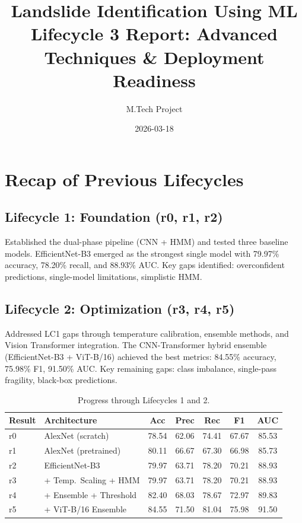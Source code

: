 \documentclass[11pt]{article}
\title{Landslide Identification Using ML \\ \large Lifecycle 3 Report: Advanced Techniques \& Deployment Readiness}
\author{M.Tech Project}
\date{2026-03-18}
\begin{document}
\maketitle

\section{Recap of Previous Lifecycles}

\subsection{Lifecycle 1: Foundation (r0, r1, r2)}

Established the dual-phase pipeline (CNN + HMM) and tested three baseline models. EfficientNet-B3 emerged as the strongest single model with 79.97\% accuracy, 78.20\% recall, and 88.93\% AUC. Key gaps identified: overconfident predictions, single-model limitations, simplistic HMM.

\subsection{Lifecycle 2: Optimization (r3, r4, r5)}

Addressed LC1 gaps through temperature calibration, ensemble methods, and Vision Transformer integration. The CNN-Transformer hybrid ensemble (EfficientNet-B3 + ViT-B/16) achieved the best metrics: 84.55\% accuracy, 75.98\% F1, 91.50\% AUC. Key remaining gaps: class imbalance, single-pass fragility, black-box predictions.

\begin{table}[H]
    \centering
    \small
    \renewcommand{\arraystretch}{1.2}
    \begin{tabular}{llccccc}
        \toprule
        \textbf{Result} & \textbf{Architecture} & \textbf{Acc} & \textbf{Prec} & \textbf{Rec} & \textbf{F1} & \textbf{AUC} \\
        \midrule
        r0 & AlexNet (scratch) & 78.54 & 62.06 & 74.41 & 67.67 & 85.53 \\
        r1 & AlexNet (pretrained) & 80.11 & 66.67 & 67.30 & 66.98 & 85.73 \\
        r2 & EfficientNet-B3 & 79.97 & 63.71 & 78.20 & 70.21 & 88.93 \\
        r3 & + Temp.\ Scaling + HMM & 79.97 & 63.71 & 78.20 & 70.21 & 88.93 \\
        r4 & + Ensemble + Threshold & 82.40 & 68.03 & 78.67 & 72.97 & 89.83 \\
        r5 & + ViT-B/16 Ensemble & 84.55 & 71.50 & 81.04 & 75.98 & 91.50 \\
        \bottomrule
    \end{tabular}
    \caption{Progress through Lifecycles 1 and 2.}
\end{table}
\end{document}
